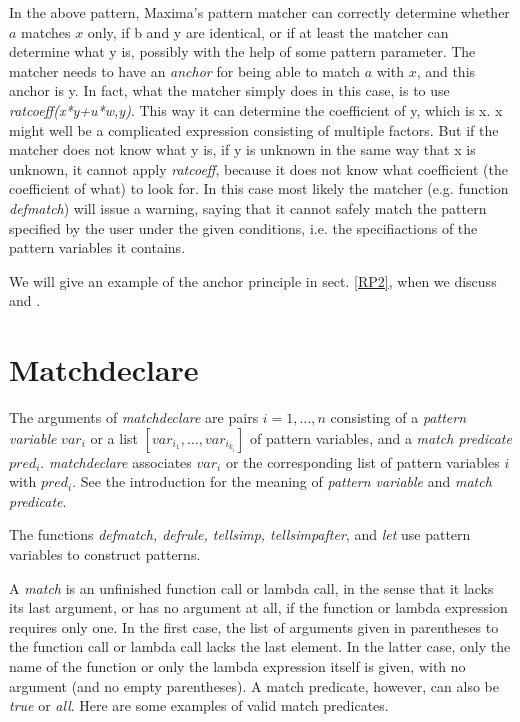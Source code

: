 \documentclass[../Maxima_Workbook.tex]{subfiles}
\begin{document}
\lz In the above pattern, Maxima's pattern matcher can correctly determine whether $ a $ matches $ x $ only, if b and y are identical, or if at least the matcher can determine what y is, possibly with the help of some pattern parameter. The matcher needs to have an \emph{anchor} for being able to match $ a $ with $ x $, and this anchor is y. In fact, what the matcher simply does in this case, is to use \emph{ratcoeff(x*y+u*w,y)}. This way it can determine the coefficient of y, which is x. x might well be a complicated expression consisting of multiple factors. But if the matcher does not know what y is, if y is unknown in the same way that x is unknown, it cannot apply \emph{ratcoeff}, because it does not know what coefficient (the coefficient of what) to look for. In this case most likely the matcher (e.g. function \emph{defmatch}) will issue a warning, saying that it cannot safely match the pattern specified by the user under the given conditions, i.e. the specifiactions of the pattern variables it contains. 

\lz We will give an example of the anchor principle in sect. \ref{RP2}, when we discuss  and .

\section{Matchdeclare}

 \hfill \tcr{[function]}

\lz The arguments of \emph{matchdeclare} are pairs $ i=1,\dots,n $ consisting of a \emph{pattern variable} $ var_i $ or a list $ [var_{i_1},\dots,var_{i_{k_i}}] $ of pattern variables, and a \emph{match predicate} $ pred_i $. \emph{matchdeclare} associates $ var_i $ or the corresponding list of pattern variables $ i $ with $ pred_i $. See the introduction for the meaning of \emph{pattern variable} and \emph{match predicate}. 

\lz The functions \emph{defmatch, defrule, tellsimp, tellsimpafter}, and \emph{let} use pattern variables to construct patterns.

\lz A \emph{match}  is an unfinished function call or lambda call, in the sense that it lacks its last argument, or has no argument at all, if the function or lambda expression requires only one. In the first case, the list of arguments given in parentheses to the function call or lambda call lacks the last element. In the latter case, only the name of the function or only the lambda expression itself is given, with no argument (and no empty parentheses). A match predicate, however, can also be \emph{true} or \emph{all}. Here are some examples of valid match predicates.
\end{document}
